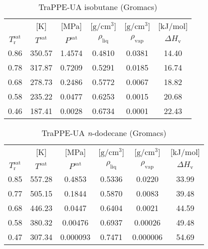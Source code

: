 \documentclass[%
 aip,
 jcp,
 sd,%
 amsmath,amssymb,
]{revtex4-1}
\begin{document}
\begin{table*}[!htbp]
\centering
\caption{
TraPPE-UA isobutane (Gromacs)
}
\label{tab:TraPPE-iC4-trappe-gmx}
\begin{ruledtabular}
\begin{tabular}{cccccc}
 & {[}K{]} &	 {[}MPa{]} & {[}$\mathrm{g/cm^3}${]} & {[}$\mathrm{g/cm^3}${]}	& {[}kJ/mol{]}  \\
$T_\mathrm{r}^{\mathrm{sat}}$ & $T^{\mathrm{sat}}$ & $P^{\mathrm{sat}}$ & $\rho_{\mathrm{liq}}$ & $\rho_{\mathrm{vap}}$ & $\Delta H_{\mathrm{v}}$ \\
\hline													
0.86	&	350.57	&	1.4574	&	0.4810	&	0.0381	&	14.40	\\
0.78	&	317.87	&	0.7209	&	0.5291	&	0.0185	&	16.74	\\
0.68	&	278.73	&	0.2486	&	0.5772	&	0.0067	&	18.82	\\
0.58	&	235.22	&	0.0477	&	0.6253	&	0.0015	&	20.68	\\
0.46	&	187.41	&	0.0028	&	0.6734	&	0.0001	&	22.43	\\
\end{tabular}
\end{ruledtabular}
\end{table*}

\begin{table*}[!htbp]
\centering
\caption{
TraPPE-UA \textit{n}-dodecane (Gromacs)
}
\label{tab:TraPPE-C12-trappe-gmx}
\begin{ruledtabular}
\begin{tabular}{cccccc}
 & {[}K{]} &	 {[}MPa{]} & {[}$\mathrm{g/cm^3}${]} & {[}$\mathrm{g/cm^3}${]}	& {[}kJ/mol{]}  \\
$T_\mathrm{r}^{\mathrm{sat}}$ & $T^{\mathrm{sat}}$ & $P^{\mathrm{sat}}$ & $\rho_{\mathrm{liq}}$ & $\rho_{\mathrm{vap}}$ & $\Delta H_{\mathrm{v}}$ \\
\hline													
0.85	&	557.28	&	0.4853	&	0.5336	&	0.0220	&	33.99	\\
0.77	&	505.15	&	0.1844	&	0.5870	&	0.0083	&	39.48	\\
0.68	&	446.23	&	0.0447	&	0.6404	&	0.0021	&	44.59	\\
0.58	&	380.32	&	0.00476	&	0.6937	&	0.00026	&	49.48	\\
0.47	&	307.34	&	0.000093	&	0.7471	&	0.000006	&	54.69	\\
\end{tabular}
\end{ruledtabular}
\end{table*}
\end{document}
